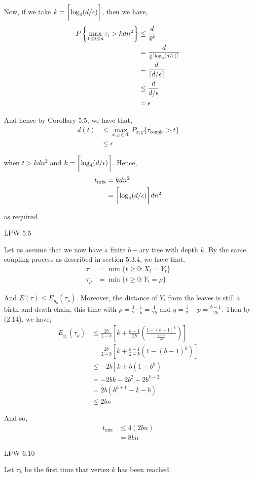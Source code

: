 \documentclass[12pt]{article}
\DeclarePairedDelimiter{\ceil}{\lceil}{\rceil}
\newenvironment{problem}[2][Problem]{\begin{trivlist}
\item[\hskip \labelsep {\bfseries #1}\hskip \labelsep {\bfseries #2.}]}{\end{trivlist}}
\begin{document}
\begin{enumerate}[label=\alph*)]
Now, if we take $k = \ceil[\bigg]{\log_4(d/\epsilon)}$, then we have,
\begin{align*}
P\left\{\max_{1 \leq i \leq d} \tau_i > kdn^2\right\} &\leq \frac{d}{4^k}\\
&= \frac{d}{4^{\ceil{\log_4(d/\epsilon)}}}\\
&= \frac{d}{\ceil{d/\epsilon}}\\
&\leq \frac{d}{d/\epsilon}\\
&= \epsilon
\end{align*}

And hence by Corollary 5.5, we have that,
\begin{align*}
d(t) &\leq \max_{x, y \in \mathcal{X}} P_{x, y}\{\tau_{\text{couple}} > t\}\\
&\leq \epsilon
\end{align*}

when $t > kdn^2$ and $k = \ceil[\bigg]{\log_4(d/\epsilon)}$. Hence,
\begin{align*}
t_{\text{mix}} &= kdn^2\\
&= \ceil[\bigg]{\log_4(d/\epsilon)}dn^2
\end{align*}

as required.
\end{enumerate}

\begin{problem}{II}
LPW 5.5
\end{problem}

Let us assume that we now have a finite $b-$ary tree with depth $k$. By the same coupling process as described in section 5.3.4, we have that,
\begin{align*}
\tau &= \min \{t \geq 0: X_t = Y_t \}\\
\tau_{\rho} &= \min\{t \geq 0: Y_t = \rho\}
\end{align*}

And $E(\tau) \leq E_{y_0}(\tau_{\rho})$. Moreover, the distance of $Y_t$ from the leaves is still a birth-and-death chain, this time with $p = \frac{1}{2} \cdot \frac{1}{b} = \frac{1}{2b}$ and $q = \frac{1}{2} - p = \frac{b-1}{2b}$. Then by (2.14), we have,
\begin{align*}
E_{y_0}(\tau_{\rho}) &\leq \frac{2b}{2-b} \left[k + \frac{b-1}{2b}\left(\frac{1 - (b-1)^k}{\frac{2-b}{2b}}\right)\right]\\
&=  \frac{2b}{2-b} \left[k + \frac{b-1}{2-b}\left(1 - (b-1)^k\right)\right]\\
&\leq -2b \left[k + b\left(1 - b^k\right)\right]\\
&= -2bk - 2b^2 + 2b^{k+2}\\
&= 2b(b^{k+1} - k - b)\\
&\leq 2bn
\end{align*}

And so,
\begin{align*}
t_{\text{mix}} &\leq 4(2bn)\\
&= 8bn
\end{align*}

\begin{problem}{III}
LPW 6.10
\end{problem}

Let $\tau_k$  be the first time that vertex $k$ has been reached.
\end{document}
